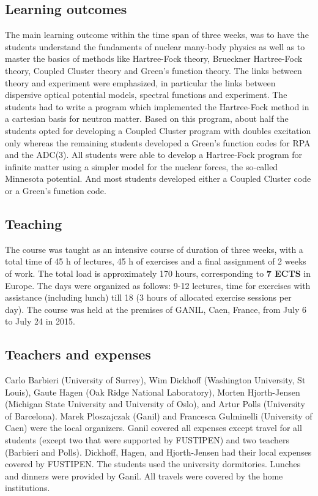 \documentclass[prc,amsart,english]{revtex4}
\begin{document}
\subsection{Learning outcomes}  The main learning outcome within the time span of three weeks, was to have the students
understand the fundaments of nuclear many-body physics as well as to master the basics of methods like Hartree-Fock theory, Brueckner Hartree-Fock theory, Coupled Cluster theory and Green's function theory. The links between theory and experiment were emphasized, in particular the links between dispersive optical potential models, spectral functions and experiment. 
The students had to write a program which implemented the Hartree-Fock method in a cartesian basis for neutron matter. Based on this program, about half the students opted for developing a Coupled Cluster program with doubles excitation only whereas the remaining students
developed a Green's function codes for RPA and the ADC(3). All students were able to develop a Hartree-Fock program for infinite matter using a simpler model for the nuclear forces, the so-called Minnesota potential. And most students developed either a Coupled Cluster code or a Green's function code. 

  
\subsection{Teaching}
The course was taught as an intensive  course of duration of three weeks, with a
total time of 45 h of lectures, 45 h of exercises and  a final assignment of 2 weeks of work.
The total load is approximately 170 hours, corresponding to  {\bf 7 ECTS} in Europe.
The days were organized as follows: 9-12 lectures, time for exercises with assistance (including lunch)
till 18 (3 hours of allocated exercise sessions per day).
The course was held at the premises of GANIL, Caen, France, from
July 6 to July 24 in 2015.




\subsection{Teachers and expenses}
Carlo Barbieri (University of Surrey), Wim Dickhoff (Washington University, St Louis), Gaute Hagen (Oak Ridge National Laboratory), Morten Hjorth-Jensen (Michigan State University and University of Oslo), and Artur Polls (University of Barcelona). Marek Ploszajczak (Ganil) and Francesca Gulminelli (University of Caen) were the local organizers. 
Ganil covered all expenses except travel for all students (except two that were supported by FUSTIPEN) and two teachers (Barbieri and Polls).
Dickhoff, Hagen, and Hjorth-Jensen had their local expenses covered by FUSTIPEN. The students used the university dormitories. Lunches and dinners were provided by Ganil. 
All travels were covered by the home institutions. 
\end{document}
